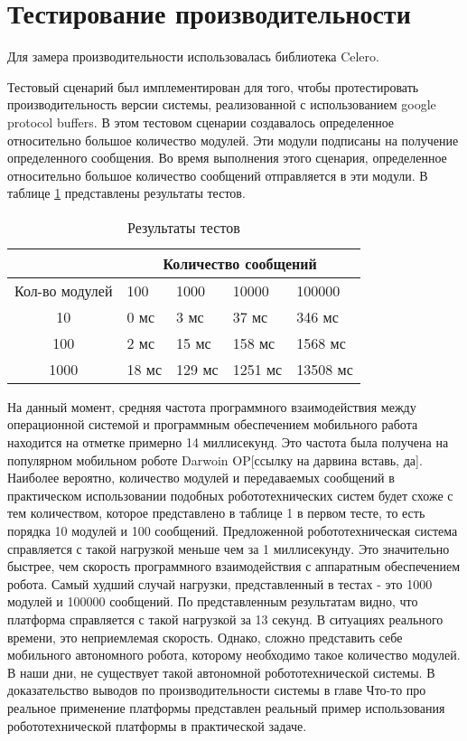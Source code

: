 \section{Тестирование производительности}

Для замера производительности использовалась библиотека Celero.

Тестовый сценарий был имплементирован для того, чтобы протестировать производительность версии системы, реализованной с использованием google protocol buffers. В этом тестовом сценарии создавалось определенное относительно большое количество модулей. Эти модули подписаны на получение определенного сообщения. Во время выполнения этого сценария, определенное относительно большое количество сообщений отправляется в эти модули. В таблице \ref{tab:sync_bench} представлены результаты тестов.

\begin{table}
    \caption{\label{tab:sync_bench}Результаты тестов}
    \begin{center}
        \begin{tabularx}{\textwidth}{|c|X|X|X|X|}
            \hline
            & \multicolumn{4}{|c|}{Количество сообщений} \\
            \hline
            Кол-во модулей & 100   & 1000   & 10000   & 100000   \\
            \hline
            10             & 0 мс  & 3 мс   & 37 мс   & 346 мс   \\
            \hline
            100            & 2 мс  & 15 мс  & 158 мс  & 1568 мс  \\
            \hline
            1000           & 18 мс & 129 мс & 1251 мс & 13508 мс \\
            \hline
        \end{tabularx}
    \end{center}
\end{table}

На данный момент, средняя частота программного взаимодействия между операционной системой и программным обеспечением мобильного работа находится на отметке примерно 14 миллисекунд. Это частота была получена на популярном мобильном роботе Darwoin OP[ссылку на дарвина вставь, да]. Наиболее вероятно, количество модулей и передаваемых сообщений в практическом использовании подобных робототехнических систем будет схоже с тем количеством, которое представлено в таблице 1 в первом тесте, то есть порядка 10 модулей и 100 сообщений. Предложенной робототехническая система справляется с такой нагрузкой меньше чем за 1 миллисекунду. Это значительно быстрее, чем скорость программного взаимодействия с аппаратным обеспечением робота. Самый худший случай нагрузки, представленный в тестах - это 1000 модулей и 100000 сообщений. По представленным результатам видно, что платформа справляется с такой нагрузкой за 13 секунд. В ситуациях реального времени, это неприемлемая скорость. Однако, сложно представить себе мобильного автономного робота, которому необходимо такое количество модулей. В наши дни, не существует такой автономной робототехнической системы. В доказательство выводов по производительности системы в главе Что-то про реальное применение платформы представлен реальный пример использования робототехнической платформы в практической задаче.